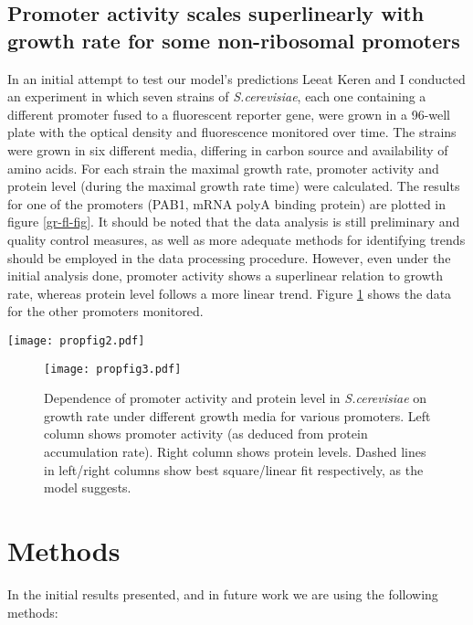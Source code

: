 \documentclass[a4page,notitlepage]{article}
\begin{document}
\subsection{Promoter activity scales superlinearly with growth rate for some non-ribosomal promoters}
In an initial attempt to test our model's predictions Leeat Keren and I conducted an experiment in which seven strains of \emph{S.cerevisiae}, each one containing a different promoter fused to a fluorescent reporter gene, were grown in a 96-well plate with the optical density and fluorescence monitored over time.
The strains were grown in six different media, differing in carbon source and availability of amino acids.
For each strain the maximal growth rate, promoter activity and protein level (during the maximal growth rate time) were calculated.
The results for one of the promoters (PAB1, mRNA polyA binding protein) are plotted in figure \ref{gr-fl-fig}.
It should be noted that the data analysis is still preliminary and quality control measures, as well as more adequate methods for identifying trends should be employed in the data processing procedure.
However, even under the initial analysis done, promoter activity shows a superlinear relation to growth rate, whereas protein level follows a more linear trend.
Figure \ref{gr-fl-mult} shows the data for the other promoters monitored.
\begin{SCfigure}
\caption{Dependence of promoter activity and protein level on growth rate for PAB1 (Poly(A) binding protein) promoter under different growth media.
(A) Protein level scales roughly like growth rate.
Dashed line shows best linear fit, as the model suggests.
(B) Promoter activity (as deduced by protein accumulation rate) exhibits a superlinear relation to growth rate.
Dashed line shows best square fit, as the model suggests.
}
\texttt{[image: propfig2.pdf]}
\label{gr-fl-fig}
\end{SCfigure}
\begin{figure}[h]
\texttt{[image: propfig3.pdf]}
\caption{Dependence of promoter activity and protein level in \emph{S.cerevisiae} on growth rate under different growth media for various promoters.
Left column shows promoter activity (as deduced from protein accumulation rate).
Right column shows protein levels.
Dashed lines in left/right columns show best square/linear fit respectively, as the model suggests.
}
\label{gr-fl-mult}
\end{figure}
\section{Methods}
\label{methods}
In the initial results presented, and in future work we are using the following methods:
\end{document}
